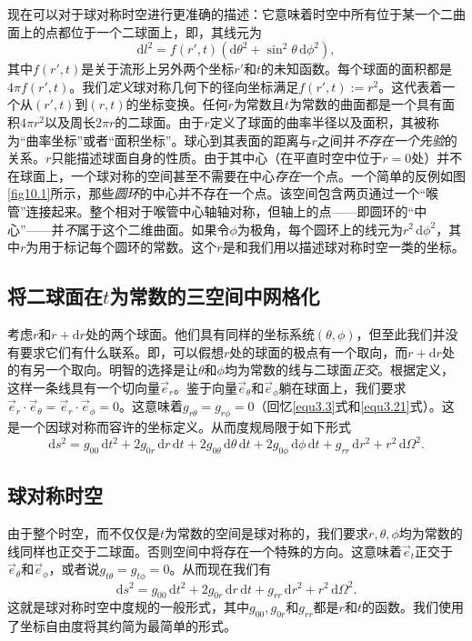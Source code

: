 现在可以对于球对称时空进行更准确的描述：它意味着时空中所有位于某一个二曲面上的点都位于一个二球面上，即，其线元为
\begin{equation}
\mathrm dl^2=f(r',t)(\mathrm d\theta^2+\sin^2\theta\,\mathrm d\phi^2),
\end{equation}
其中$f(r',t)$是关于流形上另外两个坐标$r'$和$t$的未知函数。每个球面的面积都是$4\pi f(r',t)$。我们{\it 定义}球对称几何下的径向坐标满足$f(r',t):=r^2$。这代表着一个从$(r',t)$到$(r,t)$的坐标变换。任何$r$为常数且$t$为常数的曲面都是一个具有面积$4\pi r^2$以及周长$2\pi r$的二球面。由于$r$定义了球面的曲率半径以及面积，其被称为“曲率坐标”或者“面积坐标”。球心到其表面的距离与$r$之间并{\it 不存在一个先验}的关系。$r$只能描述球面自身的性质。由于其中心（在平直时空中位于$r=0$处）并不在球面上，一个球对称的空间甚至不需要在中心{\it 存在}一个点。一个简单的反例如图\ref{fig10.1}所示，那些{\it 圆环}的中心并不存在一个点。该空间包含两页通过一个“喉管”连接起来。整个相对于喉管中心轴轴对称，但轴上的点——即圆环的“中心”——并{\it 不}属于这个二维曲面。如果令$\phi$为极角，每个圆环上的线元为$r^2\,\mathrm d\phi^2$，其中$r$为用于标记每个圆环的常数。这个$r$是和我们用以描述球对称时空一类的坐标。

\subsection*{将二球面在$t$为常数的三空间中网格化}
考虑$r$和$r+\mathrm dr$处的两个球面。他们具有同样的坐标系统$(\theta,\phi)$，但至此我们并没有要求它们有什么联系。即，可以假想$r$处的球面的极点有一个取向，而$r+\mathrm dr$处的有另一个取向。明智的选择是让$\theta$和$\phi$均为常数的线与二球面{\it 正交}。根据定义，这样一条线具有一个切向量$\vec{e}_r$。鉴于向量$\vec{e}_\theta$和$\vec{e}_\phi$躺在球面上，我们要求$\vec{e}_r\cdot\vec{e}_\theta=\vec{e}_r\cdot\vec{e}_\phi=0$。这意味着$g_{r\theta}=g_{r\phi}=0$（回忆\eqref{equ3.3}式和\eqref{equ3.21}式）。这是一个因球对称而容许的坐标定义。从而度规局限于如下形式
\begin{equation}
\mathrm ds^2=g_{00}\,\mathrm dt^2+2g_{0r}\,\mathrm dr\,\mathrm dt+2g_{0\theta}\,\mathrm d\theta\,\mathrm dt+2g_{0\phi}\,\mathrm d\phi\,\mathrm dt+g_{rr}\,\mathrm dr^2+r^2\,\mathrm d\Omega^2.
\end{equation}
\subsection*{球对称时空}
由于整个时空，而不仅仅是$t$为常数的空间是球对称的，我们要求$r,\theta,\phi$均为常数的线同样也正交于二球面。否则空间中将存在一个特殊的方向。这意味着$\vec{e}_t$正交于$\vec{e}_\theta$和$\vec{e}_\phi$，或者说$g_{t\theta}=g_{t\phi}=0$。从而现在我们有
\begin{equation}
\mathrm ds^2=g_{00}\,\mathrm dt^2+2g_{0r}\,\mathrm dr\,\mathrm dt+g_{rr}\,\mathrm dr^2+r^2\,\mathrm d\Omega^2.
\end{equation}
这就是球对称时空中度规的一般形式，其中$g_{00},g_{0r}$和$g_{rr}$都是$r$和$t$的函数。我们使用了坐标自由度将其约简为最简单的形式。

